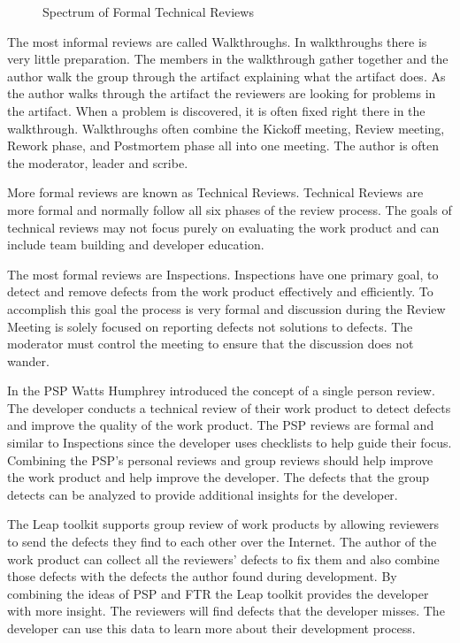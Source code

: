 \begin{figure}[htbp]
  \caption{Spectrum of Formal Technical Reviews}
  \label{fig:ftrspectrum}
\end{figure}

The most informal reviews are called Walkthroughs\cite{Yourdon79}. In
walkthroughs there is very little preparation.  The members in the walkthrough
gather together and the author walk the group through the artifact explaining
what the artifact does.  As the author walks through the artifact the reviewers
are looking for problems in the artifact.  When a problem is discovered, it is
often fixed right there in the walkthrough.  Walkthroughs often combine the
Kickoff meeting, Review meeting, Rework phase, and Postmortem phase all into
one meeting.  The author is often the moderator, leader and scribe.

More formal reviews are known as Technical Reviews.  Technical Reviews are more 
formal and normally follow all six phases of the review process.  The goals of
technical reviews may not focus purely on evaluating the work product and can
include team building and developer education.  

The most formal reviews are Inspections\cite{Fagan76}.  Inspections have one
primary goal, to detect and remove defects from the work product effectively and 
efficiently. To accomplish this goal the process is very formal and discussion
during the Review Meeting is solely focused on reporting defects not solutions
to defects.  The moderator must control the meeting to ensure that the
discussion does not wander.

In the PSP Watts Humphrey introduced the concept of a single person review.
The developer conducts a technical review of their work product to detect
defects and improve the quality of the work product.  The PSP reviews are formal 
and similar to Inspections since the developer uses checklists to help guide
their focus. Combining the PSP's personal reviews and group reviews should help 
improve the work product and help improve the developer.  The defects that the
group detects can be analyzed to provide additional insights for the developer.

The Leap toolkit supports group review of work products by allowing reviewers
to send the defects they find to each other over the Internet.  The author of
the work product can collect all the reviewers' defects to fix them and also
combine those defects with the defects the author found during development.  By 
combining the ideas of PSP and FTR the Leap toolkit provides the developer with 
more insight.  The reviewers will find defects that the developer misses.  The
developer can use this data to learn more about their development process.

